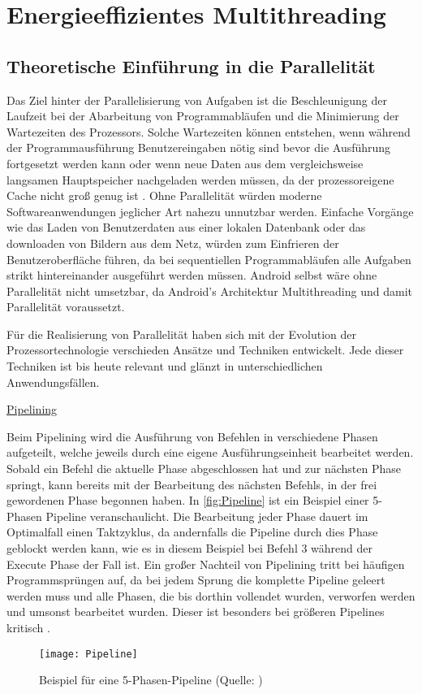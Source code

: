 \chapter{Energieeffizientes Multithreading}
\section{Theoretische Einführung in die Parallelität}
Das Ziel hinter der Parallelisierung von Aufgaben ist die Beschleunigung der Laufzeit bei der Abarbeitung von Programmabläufen und die Minimierung der Wartezeiten des Prozessors. Solche Wartezeiten können entstehen, wenn während der Programmausführung Benutzereingaben nötig sind bevor die Ausführung fortgesetzt werden kann oder wenn neue Daten aus dem vergleichsweise langsamen Hauptspeicher nachgeladen werden müssen, da der prozessoreigene Cache nicht groß genug ist \cite[1135]{wolf2020}. Ohne Parallelität würden moderne Softwareanwendungen jeglicher Art nahezu unnutzbar werden. Einfache Vorgänge wie das Laden von Benutzerdaten aus einer lokalen Datenbank oder das downloaden von Bildern aus dem Netz, würden zum Einfrieren der Benutzeroberfläche führen, da bei sequentiellen Programmabläufen alle Aufgaben strikt hintereinander ausgeführt werden müssen. Android selbst wäre ohne Parallelität nicht umsetzbar, da Android's Architektur Multithreading und damit Parallelität voraussetzt.

Für die Realisierung von Parallelität haben sich mit der Evolution der Prozessortechnologie verschieden Ansätze und Techniken entwickelt. Jede dieser Techniken ist bis heute relevant und glänzt in unterschiedlichen Anwendungsfällen.

\underline{Pipelining}

Beim Pipelining wird die Ausführung von Befehlen in verschiedene Phasen aufgeteilt, welche jeweils durch eine eigene Ausführungseinheit bearbeitet werden. Sobald ein Befehl die aktuelle Phase abgeschlossen hat und zur nächsten Phase springt, kann bereits mit der Bearbeitung des nächsten Befehls, in der frei gewordenen Phase begonnen haben. In \autoref{fig:Pipeline} ist ein Beispiel einer 5-Phasen Pipeline veranschaulicht. Die Bearbeitung jeder Phase dauert im Optimalfall einen Taktzyklus, da andernfalls die Pipeline durch dies Phase geblockt werden kann, wie es in diesem Beispiel bei Befehl 3 während der Execute Phase der Fall ist. Ein großer Nachteil von Pipelining tritt bei häufigen Programmsprüngen auf, da bei jedem Sprung die komplette Pipeline geleert werden muss und alle Phasen, die bis dorthin vollendet wurden, verworfen werden und umsonst bearbeitet wurden. Dieser ist besonders bei größeren Pipelines kritisch \cite{pipelineElektro}.
\begin{figure}[H]
	\begin{center}	 
	\texttt{[image: Pipeline]}
	\caption{Beispiel für eine 5-Phasen-Pipeline (Quelle: \cite{pipelineElektro})}
	\label{fig:Pipeline} 
	\end{center}
\end{figure}

